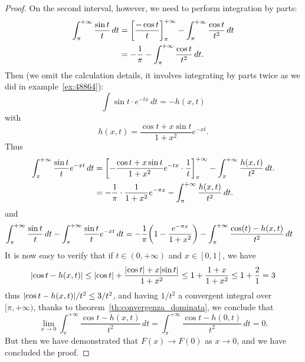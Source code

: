 \begin{proof}
On the second interval, however, we need to perform integration by parts:
\begin{align*}
  \int_\pi^{+\infty} \frac{\sin t}{t}\, dt 
  &= {\left[ \frac{-\cos t}{t} \right]}_{\pi}^{+\infty}
    - \int_{\pi}^{+\infty} \frac{\cos t}{t^2}\, dt \\
  &= -\frac{1}{\pi} - \int_{\pi}^{+\infty} \frac {\cos t}{t^2}\, dt.\\
\end{align*}
Then (we omit the calculation details, 
it involves integrating by parts twice as 
we did in example~\ref{ex:48864}):
\[
\int \sin t\cdot e^{-tx}\, dt 
= -h(x,t)
\]
with 
\[
h(x,t)= \frac{\cos t+x\sin t}{1+x^2}e^{-xt}.  
\]
Thus 
\begin{align*}
  \int_\pi^{+\infty} \frac{\sin t}{t} e^{-xt}\, dt 
    &= {\left[ -\frac{\cos t+ x \sin t}{1+x^2}e^{-tx}\cdot
  \frac{1}{t} \right]}_{\pi}^{+\infty}
  - \int_\pi^{+\infty}\frac{h(x,t)}{t^2}\, dt.\\  
    &= -\frac 1 \pi\cdot \frac{1}{1+x^2}e^{-\pi x} -
  \int_\pi^{+\infty}\frac{h(x,t)}{t^2}\, dt.
\end{align*}
and
\begin{align*}
\int_\pi^{+\infty} \frac{\sin t}{t}\, dt 
-\int_\pi^{+\infty} \frac{\sin t}{t} e^{-xt}\, dt
&= -\frac 1 \pi {\left( 1-\frac{e^{-\pi x}}{1+x^2} \right)}
-\int_\pi^{+\infty} \frac{\cos(t) - h(x,t)}{t^2}\, dt 
\end{align*}
It is now easy to verify that if $t\in(0,+\infty)$
and $x\in[0,1]$, we have 
\[
{\left|\cos t - h(x,t)\right|} \le {\left|\cos t\right|} + \frac{{\left|\cos t\right|}+x{\left|\sin t\right|}}{1+x^2}
\le 1+ \frac{1+x}{1+x^2} \le 1 + \frac 2 1 = 3
\]
thus ${\left|\cos t - h(x,t)\right|}/t^2 \le 3/t^2$, and having $1/t^2$ 
a convergent integral over $[\pi,+\infty)$, thanks 
to theorem~\ref{th:convergenza_dominata}, we conclude 
that 
\[
\lim_{x\to 0} \int_\pi^{+\infty} \frac{\cos t - h(x,t)}{t^2}\, dt 
= \int_{\pi}^{+\infty} \frac{\cos t - h(0,t)}{t^2}\, dt 
= 0.  
\]
But then we have demonstrated that $F(x)\to F(0)$ as $x\to 0$, 
and we have concluded the proof.
\end{proof}